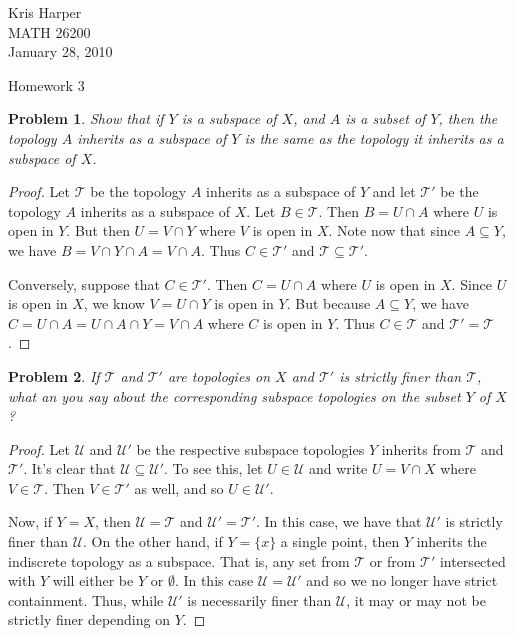 \documentclass{article}
\newtheorem{problem}{Problem}
\begin{document}
\begin{flushright}
Kris Harper\\

MATH 26200\\

January 28, 2010
\end{flushright}

\begin{center}
Homework 3
\end{center}

\begin{problem}
Show that if $Y$ is a subspace of $X$, and $A$ is a subset of $Y$, then the topology $A$ inherits as a subspace of $Y$ is the same as the topology it inherits as a subspace of $X$.
\end{problem}
\begin{proof}
Let $\mathcal{T}$ be the topology $A$ inherits as a subspace of $Y$ and let $\mathcal{T}'$ be the topology $A$ inherits as a subspace of $X$. Let $B \in \mathcal{T}$. Then $B = U \cap A$ where $U$ is open in $Y$. But then $U = V \cap Y$ where $V$ is open in $X$. Note now that since $A \subseteq Y$, we have $B = V \cap Y \cap A = V \cap A$. Thus $C \in \mathcal{T}'$ and $\mathcal{T} \subseteq \mathcal{T}'$.

Conversely, suppose that $C \in \mathcal{T}'$. Then $C = U \cap A$ where $U$ is open in $X$. Since $U$ is open in $X$, we know $V = U \cap Y$ is open in $Y$. But because $A \subseteq Y$, we have $C = U \cap A = U \cap A \cap Y = V \cap A$ where $C$ is open in $Y$. Thus $C \in \mathcal{T}$ and $\mathcal{T}' = \mathcal{T}$.
\end{proof}

\begin{problem}
If $\mathcal{T}$ and $\mathcal{T}'$ are topologies on $X$ and $\mathcal{T}'$ is strictly finer than $\mathcal{T}$, what an you say about the corresponding subspace topologies on the subset $Y$ of $X$?
\end{problem}
\begin{proof}
Let $\mathcal{U}$ and $\mathcal{U}'$ be the respective subspace topologies $Y$ inherits from $\mathcal{T}$ and $\mathcal{T}'$. It's clear that $\mathcal{U} \subseteq \mathcal{U'}$. To see this, let $U \in \mathcal{U}$ and write $U = V \cap X$ where $V \in \mathcal{T}$. Then $V \in \mathcal{T'}$ as well, and so $U \in \mathcal{U}'$.

Now, if $Y = X$, then $\mathcal{U} = \mathcal{T}$ and $\mathcal{U}' = \mathcal{T}'$. In this case, we have that $\mathcal{U}'$ is strictly finer than $\mathcal{U}$. On the other hand, if $Y = \{x\}$ a single point, then $Y$ inherits the indiscrete topology as a subspace. That is, any set from $\mathcal{T}$ or from $\mathcal{T}'$ intersected with $Y$ will either be $Y$ or $\emptyset$. In this case $\mathcal{U} = \mathcal{U}'$ and so we no longer have strict containment. Thus, while $\mathcal{U}'$ is necessarily finer than $\mathcal{U}$, it may or may not be strictly finer depending on $Y$.
\end{proof}
\end{document}
